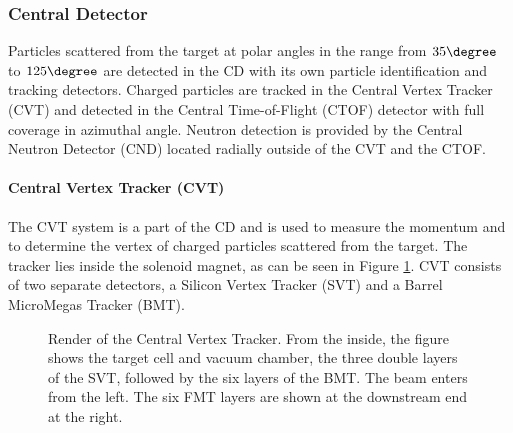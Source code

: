 \subsubsection{Central Detector} \label{sssec::centraldetector}
    Particles scattered from the target at polar angles in the range from $35\degree$ to $125\degree$ are detected in the CD with its own particle identification and tracking detectors.
    Charged particles are tracked in the Central Vertex Tracker (CVT) and detected in the Central Time-of-Flight (CTOF) detector with full coverage in azimuthal angle.
    Neutron detection is provided by the Central Neutron Detector (CND) located radially outside of the CVT and the CTOF.

\paragraph{Central Vertex Tracker (CVT)}
    The CVT system is a part of the CD and is used to measure the momentum and to determine the vertex of charged particles scattered from the target.
    The tracker lies inside the solenoid magnet, as can be seen in Figure \ref{fig::cvt}.
    CVT consists of two separate detectors, a Silicon Vertex Tracker (SVT) and a
    Barrel MicroMegas Tracker (BMT).

    \begin{figure}
        \centering{}
        \caption[CVT]{Render of the Central Vertex Tracker.
        From the inside, the figure shows the target cell and vacuum chamber, the three double layers of the SVT, followed by the six layers of the BMT.
        The beam enters from the left.
        The six FMT layers are shown at the downstream end at the right.}
        \label{fig::cvt}
    \end{figure}


